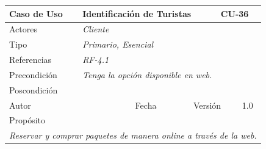 \begin{table}[H]
    \begin{tabular}{|llllllll|}
    \hline
    \multicolumn{1}{|l|}{Caso de Uso}       & \multicolumn{5}{l|}{Identificación de Turistas}                                                                          & \multicolumn{2}{l|}{\cellcolor[HTML]{E6E6E6}CU-36}          \\ \hline
    \multicolumn{1}{|l|}{Actores}           & \multicolumn{7}{l|}{{\color[HTML]{808080} \textit{Cliente}}}                                                                                                                           \\ \hline
    \multicolumn{1}{|l|}{Tipo}              & \multicolumn{7}{l|}{{\color[HTML]{808080} \textit{Primario, Esencial}}}                                                                                                                \\ \hline
    \multicolumn{1}{|l|}{Referencias}       & \multicolumn{2}{l|}{{\color[HTML]{808080} \textit{RF-4.1}}}              & \multicolumn{5}{l|}{}                                                                                       \\ \hline
    \multicolumn{1}{|l|}{Precondición}      & \multicolumn{7}{l|}{{\color[HTML]{808080} \textit{Tenga la opción disponible en web.}}}                                                                                                \\ \hline
    \multicolumn{1}{|l|}{Poscondición}      & \multicolumn{7}{l|}{}                                                                                                                                                                  \\ \hline
    \multicolumn{1}{|l|}{Autor}             & \multicolumn{1}{l|}{}                        & \multicolumn{2}{l|}{Fecha}           & \multicolumn{1}{l|}{}     & \multicolumn{2}{l|}{Versión}         & 1.0                           \\ \hline
    \multicolumn{8}{|l|}{\cellcolor[HTML]{F2F2F2}Propósito}                                                                                                                                                                          \\ \hline
    \multicolumn{8}{|p{15cm}|}{{\color[HTML]{808080} \textit{Reservar y comprar paquetes de manera online a través de la web.}}}                                                                                                           \\ \hline

\end{tabular}
\end{table}
